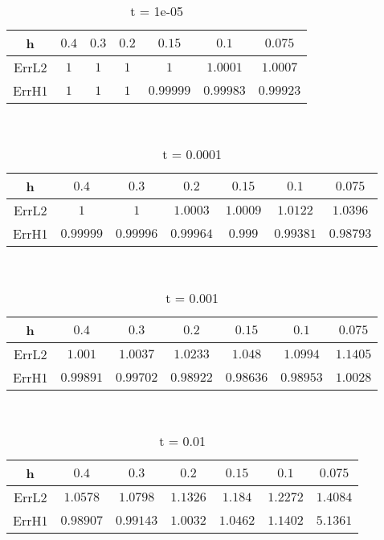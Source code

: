 \documentclass{standalone}
\begin{document}
\clearpage
\hfill \\ 
\begin{table}[!h]
\centering
\begin{tabular}{ | c | c | c | c | c | c | c | }
\hline
h	&	$0.4$ & $0.3$ & $0.2$ & $0.15$ & $0.1$ & $0.075$ \\ \hline
ErrL2	&	$1$ & $1$ & $1$ & $1$ & $1.0001$ & $1.0007$ \\ \hline
ErrH1	&	$1$ & $1$ & $1$ & $0.99999$ & $0.99983$ & $0.99923$ \\ \hline
\end{tabular}
\caption{t = 1e-05 }
\end{table}

\hfill \\ 
\begin{table}[!h]
\centering
\begin{tabular}{ | c | c | c | c | c | c | c | }
\hline
h	&	$0.4$ & $0.3$ & $0.2$ & $0.15$ & $0.1$ & $0.075$ \\ \hline
ErrL2	&	$1$ & $1$ & $1.0003$ & $1.0009$ & $1.0122$ & $1.0396$ \\ \hline
ErrH1	&	$0.99999$ & $0.99996$ & $0.99964$ & $0.999$ & $0.99381$ & $0.98793$ \\ \hline
\end{tabular}
\caption{t = 0.0001 }
\end{table}

\hfill \\ 
\begin{table}[!h]
\centering
\begin{tabular}{ | c | c | c | c | c | c | c | }
\hline
h	&	$0.4$ & $0.3$ & $0.2$ & $0.15$ & $0.1$ & $0.075$ \\ \hline
ErrL2	&	$1.001$ & $1.0037$ & $1.0233$ & $1.048$ & $1.0994$ & $1.1405$ \\ \hline
ErrH1	&	$0.99891$ & $0.99702$ & $0.98922$ & $0.98636$ & $0.98953$ & $1.0028$ \\ \hline
\end{tabular}
\caption{t = 0.001 }
\end{table}

\hfill \\ 
\begin{table}[!h]
\centering
\begin{tabular}{ | c | c | c | c | c | c | c | }
\hline
h	&	$0.4$ & $0.3$ & $0.2$ & $0.15$ & $0.1$ & $0.075$ \\ \hline
ErrL2	&	$1.0578$ & $1.0798$ & $1.1326$ & $1.184$ & $1.2272$ & $1.4084$ \\ \hline
ErrH1	&	$0.98907$ & $0.99143$ & $1.0032$ & $1.0462$ & $1.1402$ & $5.1361$ \\ \hline
\end{tabular}
\caption{t = 0.01 }
\end{table}


\clearpage
\end{document}
